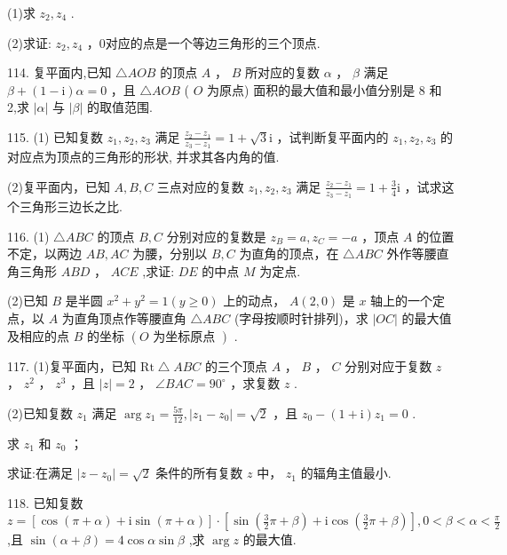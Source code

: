 \documentclass[10pt]{article}
\newcommand*\circled[1]{\tikz[baseline=(char.base)]{\node[shape=circle,draw,inner sep=1.5pt] (char) {\small #1};}}
\begin{document}
(1)求 \({z}_{2},{z}_{4}\) .

(2)求证: \({z}_{2},{z}_{4}\) ，0对应的点是一个等边三角形的三个顶点.

114. 复平面内,已知 \(\bigtriangleup  {AOB}\) 的顶点 \(A\) ， \(B\) 所对应的复数 \(\alpha\) ， \(\beta\) 满足 \(\beta  + \left( {1 - \mathrm{i}}\right) \alpha  = 0\) ，且 \(\bigtriangleup  {AOB}\) ( \(O\) 为原点) 面积的最大值和最小值分别是 8 和 2,求 \(\left| \alpha \right|\) 与 \(\left| \beta \right|\) 的取值范围.

115. (1) 已知复数 \({z}_{1},{z}_{2},{z}_{3}\) 满足 \(\frac{{z}_{2} - {z}_{1}}{{z}_{3} - {z}_{1}} = 1 + \sqrt{3}\mathrm{i}\) ，试判断复平面内的 \({z}_{1},{z}_{2},{z}_{3}\) 的对应点为顶点的三角形的形状, 并求其各内角的值.

(2)复平面内，已知 \(A,B,C\) 三点对应的复数 \({z}_{1},{z}_{2},{z}_{3}\) 满足 \(\frac{{z}_{2} - {z}_{1}}{{z}_{3} - {z}_{1}} = 1 + \frac{3}{4}\mathrm{i}\) ，试求这个三角形三边长之比.

116. (1) \(\bigtriangleup  {ABC}\) 的顶点 \(B,C\) 分别对应的复数是 \({z}_{B} = a,{z}_{C} =  - a\) ，顶点 \(A\) 的位置不定，以两边 \({AB},{AC}\) 为腰，分别以 \(B,C\) 为直角的顶点，在 \(\bigtriangleup  {ABC}\) 外作等腰直角三角形 \({ABD}\) ， \({ACE}\) ,求证: \({DE}\) 的中点 \(M\) 为定点.

(2)已知 \(B\) 是半圆 \({x}^{2} + {y}^{2} = 1\left( {y \geq  0}\right)\) 上的动点， \(A\left( {2,0}\right)\) 是 \(x\) 轴上的一个定点，以 \(A\) 为直角顶点作等腰直角 \(\bigtriangleup  {ABC}\) (字母按顺时针排列)，求 \(\left| {OC}\right|\) 的最大值及相应的点 \(B\) 的坐标 \(\left( {O\text{ 为坐标原点 }}\right)\) .

117. (1)复平面内，已知 \(\mathrm{{Rt}} \bigtriangleup  {ABC}\) 的三个顶点 \(A\) ， \(B\) ， \(C\) 分别对应于复数 \(z\) ， \({z}^{2}\) ， \({z}^{3}\) ，且 \(\left| z\right|  = 2\) ， \(\angle {BAC} = {90}^{ \circ  }\) ，求复数 \(z\) .

(2)已知复数 \({z}_{1}\) 满足 \(\arg {z}_{1} = \frac{5\pi }{12},\left| {{z}_{1} - {z}_{0}}\right|  = \sqrt{2}\) ，且 \({z}_{0} - \left( {1 + \mathrm{i}}\right) {z}_{1} = 0\) .

 \circled{1}  求 \({z}_{1}\) 和 \({z}_{0}\) ；

 \circled{2}  求证:在满足 \(\left| {z - {z}_{0}}\right|  = \sqrt{2}\) 条件的所有复数 \(z\) 中， \({z}_{1}\) 的辐角主值最小.

118. 已知复数 \(z = \left\lbrack  {\cos \left( {\pi  + \alpha }\right)  + \mathrm{i}\sin \left( {\pi  + \alpha }\right) }\right\rbrack   \cdot  \left\lbrack  {\sin \left( {\frac{3}{2}\pi  + \beta }\right)  + \mathrm{i}\cos \left( {\frac{3}{2}\pi  + \beta }\right) }\right\rbrack  ,0 < \beta  < \alpha  < \frac{\pi }{2}\) ,且 \(\sin \left( {\alpha  + \beta }\right)  = 4\cos \alpha \sin \beta\) ,求 \(\arg z\) 的最大值.
\end{document}

